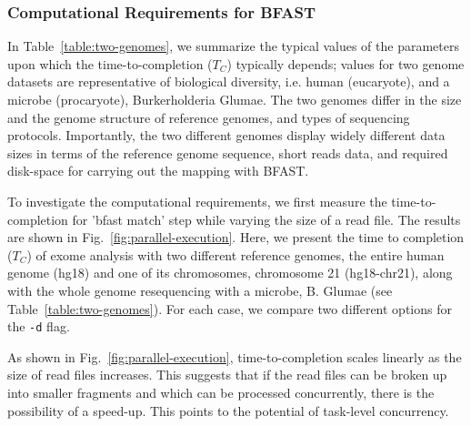 \documentclass{cpeauth}
\begin{document}


\subsubsection{Computational Requirements for BFAST}


In Table~\ref{table:two-genomes}, we summarize the typical values of
the parameters upon which the time-to-completion ($T_C$) typically
depends; values for two genome datasets are representative of
biological diversity, i.e. human (eucaryote), and a microbe (procaryote),
Burkerholderia Glumae\cite{kim2011}.  The two genomes differ
in the size and the genome structure of reference genomes, and types
of sequencing protocols.  Importantly, the two different genomes
display widely different data sizes in terms of the reference genome
sequence, short reads data, and required disk-space for carrying out
the mapping with BFAST.


To investigate the computational requirements, we first measure the
time-to-completion for 'bfast match' step while varying the size of a
read file.  The results are shown in
Fig.~\ref{fig:parallel-execution}. %
Here, we present the time to completion ($T_C$) of exome analysis with
two different reference genomes, the entire human genome (hg18) and
one of its chromosomes, chromosome 21 (hg18-chr21), along with the whole genome
resequencing with a microbe, B. Glumae\cite{kim2011} (see Table~\ref{table:two-genomes}).  For
each case, we compare two different options for the \texttt{-d} flag.

As shown in Fig.~\ref{fig:parallel-execution}, time-to-completion 
scales linearly as the size of read files increases.
This suggests that if the read files can be broken up into smaller
fragments and which can be processed concurrently, there is the
possibility of a speed-up. This points to the potential of task-level
concurrency.
\end{document}
